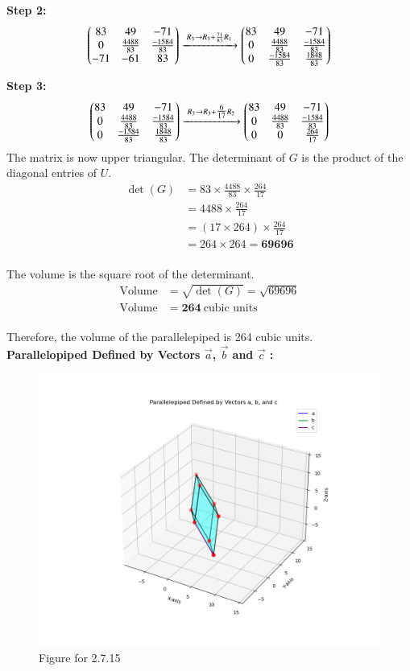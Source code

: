 \documentclass[journal]{IEEEtran}
\begin{document}
\textbf{Step 2:}
\begin{align*}
\begin{pmatrix}
83 & 49 & -71 \\
0 & \tfrac{4488}{83} & \tfrac{-1584}{83} \\
-71 & -61 & 83
\end{pmatrix}
\xrightarrow{\;R_3 \to R_3 + \frac{71}{83}R_1\;}
\begin{pmatrix}
83 & 49 & -71 \\
0 & \tfrac{4488}{83} & \tfrac{-1584}{83} \\
0 & \tfrac{-1584}{83} & \tfrac{1848}{83}
\end{pmatrix}
\end{align*}


\textbf{Step 3:}
\begin{align*}
\begin{pmatrix}
83 & 49 & -71 \\
0 & \tfrac{4488}{83} & \tfrac{-1584}{83} \\
0 & \tfrac{-1584}{83} & \tfrac{1848}{83}
\end{pmatrix}
\xrightarrow{\;R_3 \to R_3 + \tfrac{6}{17}R_2\;}
\begin{pmatrix}
83 & 49 & -71 \\
0 & \tfrac{4488}{83} & \tfrac{-1584}{83} \\
0 & 0 & \tfrac{264}{17}
\end{pmatrix}
\end{align*}
\newpage
The matrix is now upper triangular. The determinant of $G$ is the product of the diagonal entries of $U$.
\begin{align*}
\det(G) &= 83 \times \frac{4488}{83} \times \frac{264}{17} \\
&= 4488 \times \frac{264}{17} \\
&= (17 \times 264) \times \frac{264}{17} \\
&= 264 \times 264 = \mathbf{69696}
\end{align*}
\\
The volume is the square root of the determinant.
\begin{align*}
\text{Volume} &= \sqrt{\det(G)} = \sqrt{69696} \\
\text{Volume} &= \mathbf{264} \ \text{cubic units}
\end{align*}
\\


Therefore, the volume of the parallelepiped is 264 cubic units.\\


\textbf{Parallelopiped Defined by Vectors $\vec{a}$, $\vec{b}$ and $\vec{c}$ :}
\begin{figure}[h!]
    \centering
    \includegraphics[width=0.9\columnwidth]{figs/fig1.png}
    \caption{Figure for 2.7.15}
    \label{fig1}
\end{figure}
\end{document}
